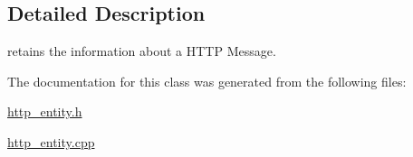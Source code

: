 \subsection{Detailed Description}
retains the information about a H\-T\-T\-P Message. 

The documentation for this class was generated from the following files\-:\begin{DoxyCompactItemize}
\item 
\hyperlink{http__entity_8h}{http\-\_\-entity.\-h}\item 
\hyperlink{http__entity_8cpp}{http\-\_\-entity.\-cpp}\end{DoxyCompactItemize}
